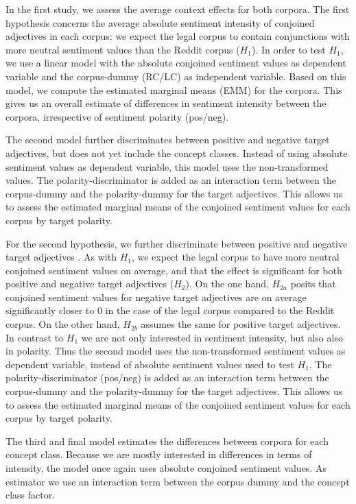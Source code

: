\documentclass{article}
\begin{document}
In the first study, we assess the average context effects for both corpora. The first hypothesis concerns the average absolute sentiment intensity of conjoined adjectives in each corpus: we expect the legal corpus to contain conjunctions with more neutral sentiment values than the Reddit corpus ($H_1$). In order to test $H_1$, we use a linear model with the absolute conjoined sentiment values as dependent variable and the corpus-dummy (RC/LC) as independent variable. Based on this model, we compute the estimated marginal means (EMM) for the corpora. This gives us an overall estimate of differences in sentiment intensity between the corpora, irrespective of sentiment polarity (pos/neg). 

The second model further discriminates between positive and negative target adjectives, but does not yet include the concept classes. Instead of using absolute sentiment values as dependent variable, this model uses the non-transformed values. The polarity-discriminator is added as an interaction term between the corpus-dummy and the polarity-dummy for the target adjectives. This allows us to assess the estimated marginal means of the conjoined sentiment values for each corpus by target polarity.

For the second hypothesis, we further discriminate between positive and negative target adjectives%
. As with $H_1$, we expect the legal corpus to have more neutral conjoined sentiment values on average, and that the effect is significant for both positive and negative target adjectives ($H_2$). On the one hand, $H_{2a}$ posits that conjoined sentiment values for negative target adjectives are on average significantly closer to 0 in the case of the legal corpus compared to the Reddit corpus.  On the other hand, $H_{2b}$ assumes the same for positive target adjectives. In contrast to $H_1$ we are not only interested in sentiment intensity, but also also in polarity. Thus the second model uses the non-transformed sentiment values as dependent variable, instead of absolute sentiment values used to test $H_1$. The polarity-discriminator (pos/neg) is added as an interaction term between the corpus-dummy and the polarity-dummy for the target adjectives. This allows us to assess the estimated marginal means of the conjoined sentiment values for each corpus by target polarity.


The third and final model estimates the differences between corpora for each concept class. Because we are mostly interested in differences in terms of intensity, the model once again uses absolute conjoined sentiment values. As estimator we use an interaction term between the corpus dummy and the concept class factor.
\end{document}
